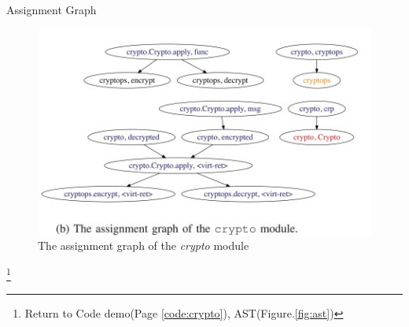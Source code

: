 \documentclass[9pt, xcolor=table]{beamer}
\begin{document}
\begin{frame}{Assignment Graph}\label{frame:assign_graph}
	\begin{figure}
		\centering
		\includegraphics[height=0.5\paperheight]{assign_graph.jpg}
		\caption{The assignment graph of the \textit{crypto} module}
		\label{fig:assign}
	\end{figure} 
	\footnote{Return to Code demo(Page \ref{code:crypto}),  AST(Figure.\ref{fig:ast})}
\end{frame}
%
\end{document}
